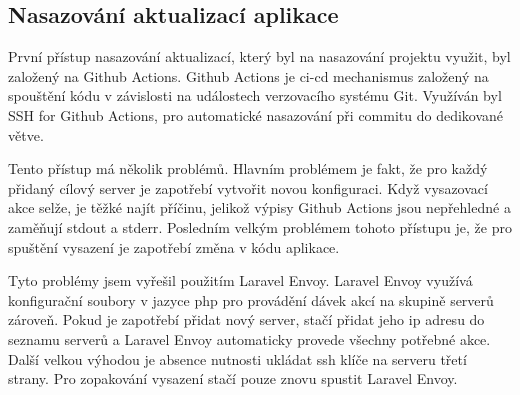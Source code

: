 \subsection{Nasazování aktualizací aplikace}
\label{sub:update-deployment}

První přístup nasazování aktualizací, který byl na nasazování projektu \linebreak
\bso využit, byl založený na Github Actions\cite{github-actions}. Github Actions je \gls{ci-cd} mechanismus založený na spouštění kódu v závislosti na událostech verzovacího systému Git\cite{git}. Využíván byl SSH for Github Actions\cite{ssh-for-github-actions}, pro automatické nasazování při commitu do dedikované větve.

Tento přístup má několik problémů. Hlavním problémem je fakt, že pro každý přidaný cílový server je zapotřebí vytvořit novou konfiguraci. Když vysazovací akce selže, je těžké najít příčinu, jelikož výpisy Github Actions jsou nepřehledné a zaměňují \acrshort{stdout} a \acrshort{stderr}. Posledním velkým problémem tohoto přístupu je, že pro spuštění vysazení je zapotřebí změna v kódu aplikace.

Tyto problémy jsem vyřešil použitím Laravel Envoy\cite{laravel-envoy}. Laravel Envoy využívá konfigurační soubory v jazyce \acrshort{php} pro provádění dávek akcí na skupině serverů zároveň. Pokud je zapotřebí přidat nový server, stačí přidat jeho \acrshort{ip} adresu do seznamu serverů a Laravel Envoy automaticky provede všechny potřebné akce. Další velkou výhodou je absence nutnosti ukládat \acrshort{ssh} klíče na serveru třetí strany. Pro zopakování vysazení stačí pouze znovu spustit Laravel Envoy.